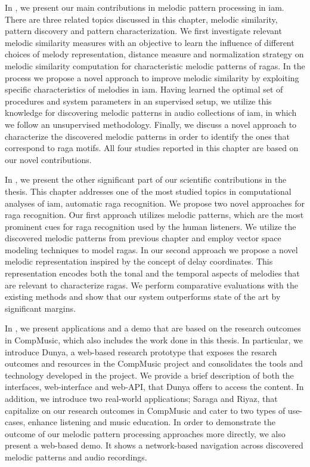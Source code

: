 In , we present our main contributions in melodic pattern processing in \gls{iam}. There are three related topics discussed in this chapter, melodic similarity, pattern discovery and pattern characterization. We first investigate relevant melodic similarity measures with an objective to learn the influence of different choices of melody representation, distance measure and normalization strategy on melodic similarity computation for characteristic melodic patterns of \glspl{raga}. In the process we propose a novel approach to improve melodic similarity by exploiting specific characteristics of melodies in \gls{iam}. Having learned the optimal set of procedures and system parameters in an supervised setup, we utilize this knowledge for discovering melodic patterns in audio collections of \gls{iam}, in which we follow an unsupervised methodology. Finally, we discuss a novel approach to characterize the discovered melodic patterns in order to identify the ones that correspond to \gls{raga} motifs. All four studies reported in this chapter are based on our novel contributions.

In , we present the other significant part of our scientific contributions in the thesis. This chapter addresses one of the most studied topics in computational analyses of \gls{iam}, automatic \gls{raga} recognition. We propose two novel approaches for \gls{raga} recognition. Our first approach utilizes melodic patterns, which are the most prominent cues for \gls{raga} recognition used by the human listeners. We utilize the discovered melodic patterns from previous chapter and employ vector space modeling techniques to model \glspl{raga}. In our second approach we propose a novel melodic representation inspired by the concept of delay coordinates. This representation encodes both the tonal and the temporal aspects of melodies that are relevant to characterize \glspl{raga}. We perform comparative evaluations with the existing methods and show that our system outperforms state of the art by significant margins.

In , we present applications and a demo that are based on the research outcomes in CompMusic, which also includes the work done in this thesis. In particular, we introduce Dunya, a web-based research prototype that exposes the resarch outcomes and resources in the CompMusic project and consolidates the tools and technology developed in the project. We provide a brief description of both the interfaces, web-interface and web-API, that Dunya offers to access the content. In addition, we introduce two real-world applications; Saraga and Riyaz, that capitalize on our research outcomes in CompMusic and cater to two types of use-cases, enhance listening and music education. In order to demonstrate the outcome of our melodic pattern processing approaches more directly, we also present a web-based demo. It shows a network-based navigation across discovered melodic patterns and audio recordings. 

